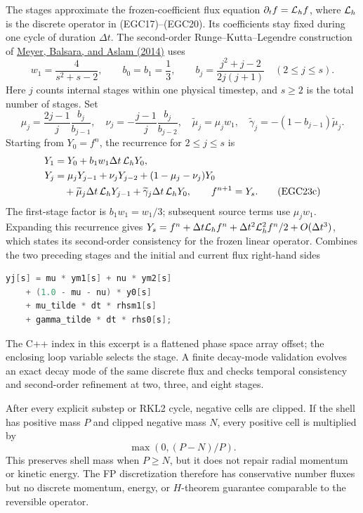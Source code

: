The stages approximate the frozen-coefficient flux equation
\(\partial_t f={\cal L}_h f\), where \({\cal L}_h\) is the discrete
operator in (EGC17)--(EGC20).  Its coefficients stay fixed during one
cycle of duration \(\Delta t\).  The second-order Runge--Kutta--Legendre
construction of
\href{https://doi.org/10.1016/j.jcp.2013.08.021}{Meyer, Balsara, and Aslam (2014)}
uses
\[
 w_1=\frac{4}{s^2+s-2},\qquad b_0=b_1=\frac13,\qquad
 b_j=\frac{j^2+j-2}{2j(j+1)}\quad(2\le j\le s).
                                                        \tag{EGC23a}
\]
Here \(j\) counts internal stages within one physical timestep, and
\(s\ge2\) is the total number of stages.  Set
\[
 \mu_j=\frac{2j-1}{j}\frac{b_j}{b_{j-1}},\quad
 \nu_j=-\frac{j-1}{j}\frac{b_j}{b_{j-2}},\quad
 \widetilde\mu_j=\mu_jw_1,\quad
 \widetilde\gamma_j=-(1-b_{j-1})\widetilde\mu_j.
                                                        \tag{EGC23b}
\]
Starting from \(Y_0=f^n\), the recurrence for \(2\le j\le s\) is
\begin{align}
 Y_1&=Y_0+b_1w_1\Delta t\,{\cal L}_hY_0,\notag\\
 Y_j&=\mu_jY_{j-1}+\nu_jY_{j-2}+(1-\mu_j-\nu_j)Y_0\notag\\
 &\quad+\widetilde\mu_j\Delta t\,{\cal L}_hY_{j-1}
 +\widetilde\gamma_j\Delta t\,{\cal L}_hY_0,
 \qquad f^{n+1}=Y_s.                                   \tag{EGC23c}
\end{align}
The first-stage factor is \(b_1w_1=w_1/3\); subsequent source terms use
\(\mu_jw_1\).  Expanding this recurrence gives
\(Y_s=f^n+\Delta t{\cal L}_hf^n+
\Delta t^2{\cal L}_h^2f^n/2+O(\Delta t^3)\), which states its
second-order consistency for the frozen linear operator.
{}
{Combines the two preceding stages and the initial and current flux right-hand sides}
\begin{lstlisting}[language=C++,basicstyle=\ttfamily\scriptsize]
yj[s] = mu * ym1[s] + nu * ym2[s]
    + (1.0 - mu - nu) * y0[s]
    + mu_tilde * dt * rhsm1[s]
    + gamma_tilde * dt * rhs0[s];
\end{lstlisting}
The C++ index  in this excerpt is a flattened phase space array
offset; the enclosing loop variable  selects the stage.
A finite decay-mode validation evolves an exact decay
mode of the same discrete flux and checks temporal consistency and
second-order refinement at two, three, and eight stages.

After every explicit substep or RKL2 cycle, negative cells are clipped.  If
the shell has positive mass \(P\) and clipped negative mass \(N\), every
positive cell is multiplied by
\[
 \max(0,(P-N)/P).                                        \tag{EGC24}
\]
This preserves shell mass when \(P\ge N\), but it does not repair radial
momentum or kinetic energy.  The FP discretization therefore has conservative
number fluxes but no discrete momentum, energy, or \(H\)-theorem guarantee
comparable to the reversible operator.

